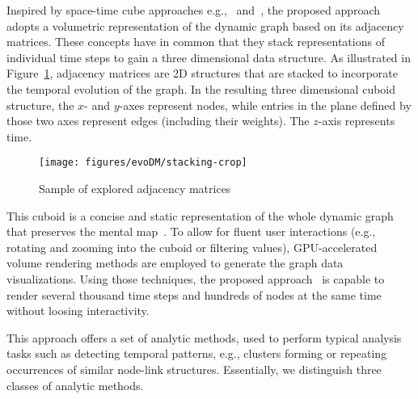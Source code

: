	Inspired by space-time cube approaches e.g.,~\cite{bach:2017} and~\cite{Bach_CHI:14}, the proposed approach adopts a volumetric representation of the dynamic graph based on its adjacency matrices.
These concepts have in common that they stack representations of individual time steps to gain a three dimensional data structure.
As illustrated in Figure~\ref{fig:illu}, adjacency matrices are 2D structures that are stacked to incorporate the temporal evolution of the graph.
In the resulting three dimensional cuboid structure, the $x$- and $y$-axes represent nodes, while entries in the plane defined by those two axes represent edges (including their weights). 
The $z$-axis represents time.

\begin{figure}
	\centering
	\texttt{[image: figures/evoDM/stacking-crop]}
	\caption{Sample of explored adjacency matrices~\cite{Bruder2019}}
	\label{fig:illu}
\end{figure}


This cuboid is a concise and static representation of the whole dynamic graph that preserves the mental map~\cite{Misue:95,Archambault:11}. 
To allow for fluent user interactions (e.g., rotating and zooming into the cuboid or filtering values), GPU-accelerated volume rendering methods are employed to generate the graph data visualizations. 
Using those techniques, the proposed approach~\cite{bruder:18} is capable to render several thousand time steps and hundreds of nodes at the same time without loosing interactivity.


This approach offers a set of analytic methods, used to perform typical analysis tasks such as detecting temporal patterns, e.g., clusters forming or repeating occurrences of similar node-link structures.
Essentially, we distinguish three classes of analytic methods.

